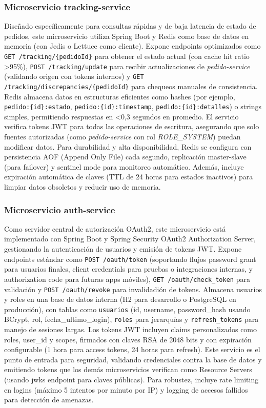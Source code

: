 \documentclass[a4paper,12pt]{article}
\begin{document}
\subsubsection{Microservicio tracking-service}
Diseñado específicamente para consultas rápidas y de baja latencia de estado de pedidos, este microservicio utiliza Spring Boot y Redis como base de datos en memoria (con Jedis o Lettuce como cliente). Expone endpoints optimizados como \texttt{GET /tracking/\{pedidoId\}} para obtener el estado actual (con cache hit ratio >95\%), \texttt{POST /tracking/update} para recibir actualizaciones de \textit{pedido-service} (validando origen con tokens internos) y \texttt{GET /tracking/discrepancies/\{pedidoId\}} para chequeos manuales de consistencia. Redis almacena datos en estructuras eficientes como hashes (por ejemplo, \texttt{pedido:\{id\}:estado}, \texttt{pedido:\{id\}:timestamp}, \texttt{pedido:\{id\}:detalles}) o strings simples, permitiendo respuestas en <0,3 segundos en promedio. El servicio verifica tokens JWT para todas las operaciones de escritura, asegurando que solo fuentes autorizadas (como \textit{pedido-service} con rol \textit{ROLE\_SYSTEM}) puedan modificar datos. Para durabilidad y alta disponibilidad, Redis se configura con persistencia AOF (Append Only File) cada segundo, replicación master-slave (para failover) y sentinel mode para monitoreo automático. Además, incluye expiración automática de claves (TTL de 24 horas para estados inactivos) para limpiar datos obsoletos y reducir uso de memoria.

\subsubsection{Microservicio auth-service}
Como servidor central de autorización OAuth2, este microservicio está implementado con Spring Boot y Spring Security OAuth2 Authorization Server, gestionando la autenticación de usuarios y emisión de tokens JWT. Expone endpoints estándar como \texttt{POST /oauth/token} (soportando flujos password grant para usuarios finales, client credentials para pruebas o integraciones internas, y authorization code para futuras apps móviles), \texttt{GET /oauth/check\_token} para validación y \texttt{POST /oauth/revoke} para invalidadión de tokens. Almacena usuarios y roles en una base de datos interna (H2 para desarrollo o PostgreSQL en producción), con tablas como \texttt{usuarios} (id, username, password\_hash usando BCrypt, rol, fecha\_ultimo\_login), \texttt{roles} para jerarquías y \texttt{refresh\_tokens} para manejo de sesiones largas. Los tokens JWT incluyen claims personalizados como roles, user\_id y scopes, firmados con claves RSA de 2048 bits y con expiración configurable (1 hora para access tokens, 24 horas para refresh). Este servicio es el punto de entrada para seguridad, validando credenciales contra la base de datos y emitiendo tokens que los demás microservicios verifican como Resource Servers (usando jwks endpoint para claves públicas). Para robustez, incluye rate limiting en logins (máximo 5 intentos por minuto por IP) y logging de accesos fallidos para detección de amenazas.
\end{document}
